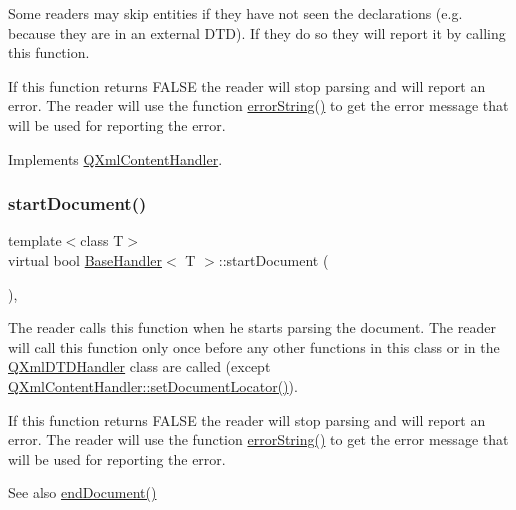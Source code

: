 Some readers may skip entities if they have not seen the declarations (e.\+g. because they are in an external D\+TD). If they do so they will report it by calling this function.

If this function returns F\+A\+L\+SE the reader will stop parsing and will report an error. The reader will use the function \mbox{\hyperlink{class_q_xml_default_handler_afcbe5fdce86cea4b7863e752c2413c45}{error\+String()}} to get the error message that will be used for reporting the error. 

Implements \mbox{\hyperlink{class_q_xml_content_handler_ac3b27d569634c5d7a7fac001a6cc4845}{Q\+Xml\+Content\+Handler}}.

\mbox{\label{class_base_handler_ad982903d941c15f7a89ff7a269a391df}} 
\subsubsection{\texorpdfstring{startDocument()}{startDocument()}}
{\footnotesize\ttfamily template$<$class T$>$ \\
virtual bool \mbox{\hyperlink{class_base_handler}{Base\+Handler}}$<$ T $>$\+::start\+Document (\begin{DoxyParamCaption}{ }\end{DoxyParamCaption})\hspace{0.3cm}{\ttfamily [inline]}, {\ttfamily [virtual]}}

The reader calls this function when he starts parsing the document. The reader will call this function only once before any other functions in this class or in the \mbox{\hyperlink{class_q_xml_d_t_d_handler}{Q\+Xml\+D\+T\+D\+Handler}} class are called (except \mbox{\hyperlink{class_q_xml_content_handler_a89863bd9a6372d3d73086aa99107bca7}{Q\+Xml\+Content\+Handler\+::set\+Document\+Locator()}}).

If this function returns F\+A\+L\+SE the reader will stop parsing and will report an error. The reader will use the function \mbox{\hyperlink{class_q_xml_default_handler_afcbe5fdce86cea4b7863e752c2413c45}{error\+String()}} to get the error message that will be used for reporting the error.

\begin{DoxySeeAlso}{See also}
\mbox{\hyperlink{class_q_xml_default_handler_a57ed6d87a89653619ff0d56078c52061}{end\+Document()}} 
\end{DoxySeeAlso}


